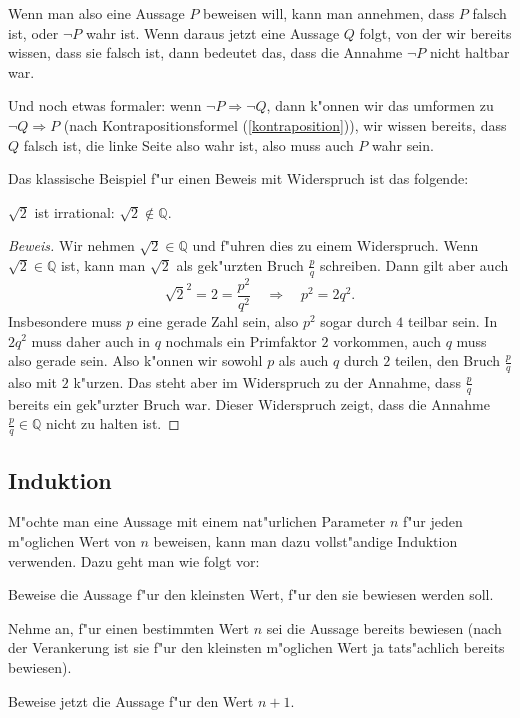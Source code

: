 Wenn man also eine Aussage $P$ beweisen will, kann man annehmen,
dass $P$ falsch ist, oder $\neg P$ wahr ist. Wenn daraus jetzt
eine Aussage $Q$ folgt, von der wir bereits wissen, dass sie falsch
ist, dann bedeutet das, dass die Annahme $\neg P$ nicht haltbar
war.

Und noch etwas formaler: wenn $\neg P\Rightarrow \neg Q$, dann k"onnen
wir das umformen zu $\neg Q\Rightarrow P$ (nach Kontrapositionsformel
(\ref{kontraposition})), wir wissen bereits, dass
$Q$ falsch ist, die linke Seite also wahr ist, also muss auch $P$
wahr sein.

Das klassische Beispiel f"ur einen Beweis mit Widerspruch ist das 
folgende:
\begin{satz}$\sqrt{2}$ ist irrational: $\sqrt{2}\not\in\mathbb Q$.
\end{satz}
\begin{proof}[Beweis]
Wir nehmen $\sqrt{2}\in\mathbb Q$ und f"uhren dies zu einem
Widerspruch. Wenn $\sqrt{2}\in\mathbb Q$ ist, kann man $\sqrt{2}$
als gek"urzten Bruch $\frac{p}{q}$ schreiben. Dann gilt aber
auch
\[
\sqrt{2}^2=2=\frac{p^2}{q^2}\quad\Rightarrow\quad p^2=2q^2.
\]
Insbesondere muss $p$ eine gerade Zahl sein, also $p^2$ sogar
durch $4$ teilbar sein. In $2q^2$ muss daher auch in $q$ nochmals
ein Primfaktor $2$ vorkommen, auch $q$ muss also gerade sein.
Also k"onnen wir sowohl $p$ als auch $q$ durch $2$ teilen,
den Bruch $\frac{p}q$ also mit $2$ k"urzen.
Das steht aber im Widerspruch zu der Annahme, dass $\frac{p}q$ bereits
ein gek"urzter Bruch war. Dieser Widerspruch zeigt, dass die
Annahme $\frac{p}q\in\mathbb Q$ nicht zu halten ist.
\end{proof}

\subsection{Induktion}
M"ochte man eine Aussage mit einem nat"urlichen Parameter $n$ f"ur jeden
m"oglichen Wert von $n$ beweisen, kann man dazu vollst"andige Induktion
verwenden. Dazu geht man wie folgt vor:
\begin{description}
\item[Verankerung:] Beweise die Aussage f"ur den kleinsten Wert,
f"ur den sie bewiesen werden soll.
\item[Induktionsannahme:] Nehme an, f"ur einen bestimmten Wert
$n$ sei die Aussage bereits bewiesen (nach der Verankerung ist sie 
f"ur den kleinsten m"oglichen Wert ja tats"achlich bereits bewiesen).
\item[Induktionsschritt:] Beweise jetzt die Aussage f"ur den Wert $n+1$.
\end{description}

